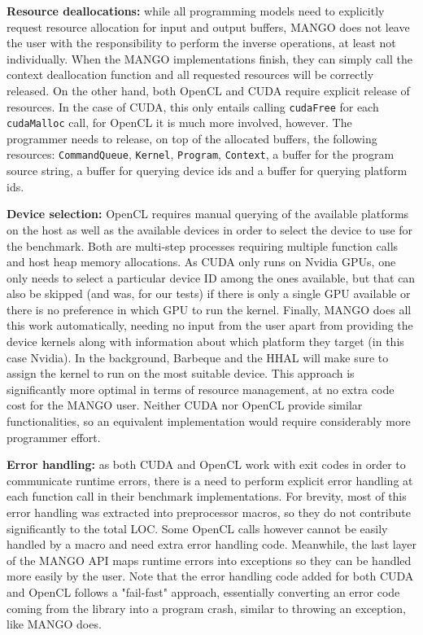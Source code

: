 \textbf{Resource deallocations:} while all programming models need to explicitly request resource allocation for input and output buffers, MANGO does not leave the user with the responsibility to perform the inverse operations, at least not individually. When the MANGO implementations finish, they can simply call the context deallocation function and all requested resources will be correctly released. On the other hand, both OpenCL and CUDA require explicit release of resources. In the case of CUDA, this only entails calling \texttt{cudaFree} for each \texttt{cudaMalloc} call, for OpenCL it is much more involved, however. The programmer needs to release, on top of the allocated buffers, the following resources: \texttt{CommandQueue}, \texttt{Kernel}, \texttt{Program}, \texttt{Context}, a buffer for the program source string, a buffer for querying device ids and a buffer for querying platform ids.

\textbf{Device selection:} OpenCL requires manual querying of the available platforms on the host as well as the available devices in order to select the device to use for the benchmark. Both are multi-step processes requiring multiple function calls and host heap memory allocations. As CUDA only runs on Nvidia GPUs, one only needs to select a particular device ID among the ones available, but that can also be skipped (and was, for our tests) if there is only a single GPU available or there is no preference in which GPU to run the kernel. Finally, MANGO does all this work automatically, needing no input from the user apart from providing the device kernels along with information about which platform they target (in this case Nvidia). In the background, Barbeque and the HHAL will make sure to assign the kernel to run on the most suitable device. This approach is significantly more optimal in terms of resource management, at no extra code cost for the MANGO user. Neither CUDA nor OpenCL provide similar functionalities, so an equivalent implementation would require considerably more programmer effort.

\textbf{Error handling:} as both CUDA and OpenCL work with exit codes in order to communicate runtime errors, there is a need to perform explicit error handling at each function call in their benchmark implementations. For brevity, most of this error handling was extracted into preprocessor macros, so they do not contribute significantly to the total LOC. Some OpenCL calls however cannot be easily handled by a macro and need extra error handling code. Meanwhile, the last layer of the MANGO API maps runtime errors into exceptions so they can be handled more easily by the user. Note that the error handling code added for both CUDA and OpenCL follows a "fail-fast" approach, essentially converting an error code coming from the library into a program crash, similar to throwing an exception, like MANGO does.

